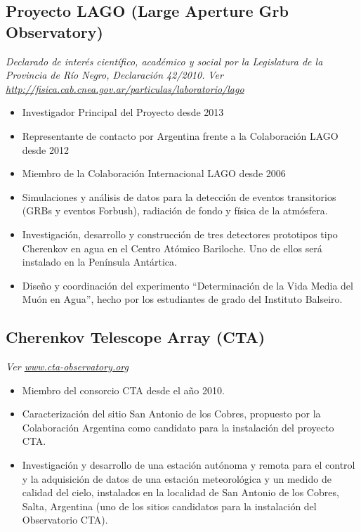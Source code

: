 \subsection*{Proyecto LAGO (Large Aperture Grb Observatory)}
{\emph{Declarado de interés científico, académico y social por la Legislatura de la
Provincia de Río Negro, Declaración 42/2010.}}
{\small{\textit{Ver \href{http://fisica.cab.cnea.gov.ar/particulas/laboratorio/lago}{http://fisica.cab.cnea.gov.ar/particulas/laboratorio/lago}}}}\\
\begin{itemize}
\item Investigador Principal del Proyecto desde 2013
\item Representante de contacto por Argentina frente a la Colaboración LAGO desde 2012
\item Miembro de la Colaboración Internacional LAGO desde 2006
\item Simulaciones y análisis de datos para la detección de eventos transitorios (GRBs y eventos Forbush), radiación de fondo y física de la atmósfera.
\item Investigación, desarrollo y construcción de tres detectores prototipos tipo Cherenkov en agua en el Centro Atómico Bariloche. Uno de ellos será instalado en la Península Antártica. 
\item Diseño y coordinación del experimento ``Determinación de la Vida Media del Muón en Agua'', hecho por los estudiantes de grado del Instituto Balseiro.
\end{itemize}

\subsection*{Cherenkov Telescope Array (CTA)}
{\small{\textit{Ver \href{http://www.cta-observatory.org}{www.cta-observatory.org}}}}
\begin{itemize}
\item Miembro del consorcio CTA desde el año 2010.
\item Caracterización del sitio San Antonio de los Cobres, propuesto por la Colaboración Argentina como candidato para la instalación del proyecto CTA.
\item Investigación y desarrollo de una estación autónoma y remota para el control y la adquisición de datos de una estación meteorológica y un medido de calidad del cielo, instalados en la localidad de San Antonio de los Cobres, Salta, Argentina (uno de los sitios candidatos para la instalación del Observatorio CTA).
\end{itemize}

